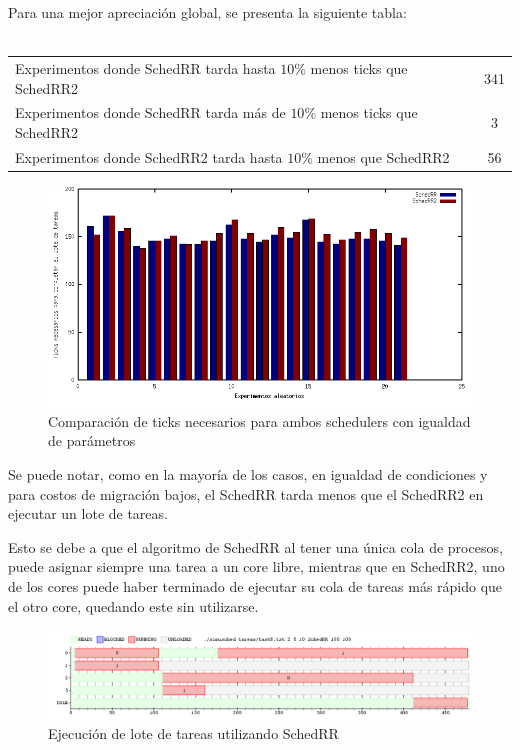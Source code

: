 \documentclass[a4paper,10pt,twoside]{article}
\begin{document}
Para una mejor apreciación global, se presenta la siguiente tabla: \\
\\
\begin{tabular}{| l | c |}
  \hline                        
  Experimentos donde SchedRR tarda hasta $10\%$ menos ticks que SchedRR2 & 341 \\
  Experimentos donde SchedRR tarda más de $10\%$ menos ticks que SchedRR2 & 3 \\
  Experimentos donde SchedRR2 tarda hasta $10\%$ menos que SchedRR2 & 56 \\
  \hline  
\end{tabular}

\begin{figure}[ht!]
\centering
\includegraphics[width=175mm]{../ejercicio8/comTicksSchedIgualdad.png}
\caption{Comparación de ticks necesarios para ambos schedulers con igualdad de parámetros}
\label{overflow}
\end{figure}

Se puede notar, como en la mayoría de los casos, en igualdad de condiciones y para costos de migración bajos, el SchedRR tarda menos que el SchedRR2 en ejecutar un lote de tareas.

Esto se debe a que el algoritmo de SchedRR al tener una única cola de procesos, puede asignar siempre una tarea a un core libre, mientras que en SchedRR2, uno de los cores puede haber terminado de ejecutar su cola de tareas más rápido que el otro core, quedando este sin utilizarse.

\begin{figure}[ht!]
\centering
\includegraphics[width=175mm]{../ejercicio8/schedRRej8.png}
\caption{Ejecución de lote de tareas utilizando SchedRR}
\label{overflow}
\end{figure}
\end{document}
